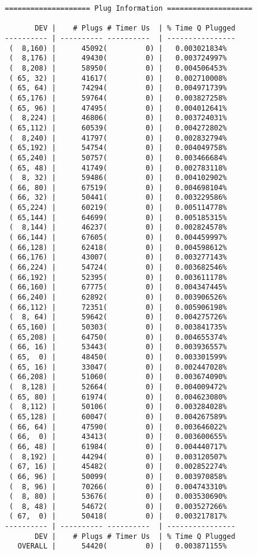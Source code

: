 \documentclass{article}
\begin{document}
\newpage\begin{verbatim}
==================== Plug Information ====================

       DEV |    # Plugs # Timer Us  | % Time Q Plugged
---------- | ---------- ----------  | ----------------
 (  8,160) |      45092(         0) |   0.003021834%
 (  8,176) |      49430(         0) |   0.003724997%
 (  8,208) |      58950(         0) |   0.004506453%
 ( 65, 32) |      41617(         0) |   0.002710008%
 ( 65, 64) |      74294(         0) |   0.004971739%
 ( 65,176) |      59764(         0) |   0.003827258%
 ( 65, 96) |      47495(         0) |   0.004012641%
 (  8,224) |      46806(         0) |   0.003724031%
 ( 65,112) |      60539(         0) |   0.004272802%
 (  8,240) |      41797(         0) |   0.002832794%
 ( 65,192) |      54754(         0) |   0.004049758%
 ( 65,240) |      50757(         0) |   0.003466684%
 ( 65, 48) |      41749(         0) |   0.002783118%
 (  8, 32) |      59486(         0) |   0.004102902%
 ( 66, 80) |      67519(         0) |   0.004698104%
 ( 66, 32) |      50441(         0) |   0.003229586%
 ( 65,224) |      60219(         0) |   0.005114778%
 ( 65,144) |      64699(         0) |   0.005185315%
 (  8,144) |      46237(         0) |   0.002824578%
 ( 66,144) |      67605(         0) |   0.004459997%
 ( 66,128) |      62418(         0) |   0.004598612%
 ( 66,176) |      43007(         0) |   0.003277143%
 ( 66,224) |      54724(         0) |   0.003682546%
 ( 66,192) |      52395(         0) |   0.003611178%
 ( 66,160) |      67775(         0) |   0.004347445%
 ( 66,240) |      62892(         0) |   0.003906526%
 ( 66,112) |      72351(         0) |   0.005906198%
 (  8, 64) |      59642(         0) |   0.004275726%
 ( 65,160) |      50303(         0) |   0.003841735%
 ( 65,208) |      64750(         0) |   0.004655374%
 ( 66, 16) |      53443(         0) |   0.003936557%
 ( 65,  0) |      48450(         0) |   0.003301599%
 ( 65, 16) |      33047(         0) |   0.002447028%
 ( 66,208) |      51060(         0) |   0.003674090%
 (  8,128) |      52664(         0) |   0.004009472%
 ( 65, 80) |      61974(         0) |   0.004623080%
 (  8,112) |      50106(         0) |   0.003284028%
 ( 65,128) |      60047(         0) |   0.004267589%
 ( 66, 64) |      47590(         0) |   0.003646022%
 ( 66,  0) |      43413(         0) |   0.003600655%
 ( 66, 48) |      61984(         0) |   0.004440717%
 (  8,192) |      44294(         0) |   0.003120507%
 ( 67, 16) |      45482(         0) |   0.002852274%
 ( 66, 96) |      50099(         0) |   0.003970858%
 (  8, 96) |      70266(         0) |   0.004743310%
 (  8, 80) |      53676(         0) |   0.003530690%
 (  8, 48) |      54672(         0) |   0.003527266%
 ( 67,  0) |      50418(         0) |   0.003217817%
---------- | ---------- ----------  | ----------------
       DEV |    # Plugs # Timer Us  | % Time Q Plugged
   OVERALL |      54420(         0) |   0.003871155%
\end{verbatim}
\end{document}

